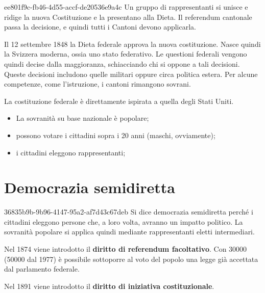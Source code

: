 \documentclass[preview]{standalone}
\begin{document}
\begin{snippet}{ee801f9c-fb46-4d55-accf-de20536e9a4c}
    Un gruppo di rappresentanti si unisce e ridige la nuova Costituzione e la presentano alla Dieta.
    Il referendum cantonale passa la decisione, e quindi tutti i Cantoni devono applicarla.
    
    Il 12 settembre 1848 la Dieta federale approva la nuova costituzione.
    Nasce quindi la Svizzera moderna, ossia uno stato federativo.
    Le questioni federali vengono quindi decise dalla maggioranza, schiacciando chi si oppone a tali decisioni.
    Queste decisioni includono quelle militari oppure circa politica estera.
    Per alcune competenze, come l'istruzione, i cantoni rimangono sovrani.
    
    La costituzione federale è direttamente ispirata a quella degli Stati Uniti.
    \begin{itemize}
        \item La sovranità su base nazionale è popolare;
        \item possono votare i cittadini sopra i 20 anni (maschi, ovviamente);
        \item i cittadini eleggono rappresentanti;
    \end{itemize}
    
\end{snippet}

\section{Democrazia semidiretta}

\begin{snippet}{36835b9b-9b96-4147-95a2-af7d43c67deb}
    Si dice democrazia semidiretta perché i cittadini eleggono persone che, a loro volta,
    avranno un impatto politico.
    La sovranità popolare si applica quindi mediante rappresentanti eletti intermediari.
    
    Nel 1874 viene introdotto il \textbf{diritto di referendum facoltativo}.
    Con 30000 (50000 dal 1977) è possibile sottoporre al voto del popolo una legge già accettata dal parlamento federale.
    
    Nel 1891 viene introdotto il \textbf{diritto di iniziativa costituzionale}.
\end{snippet}
\end{document}
